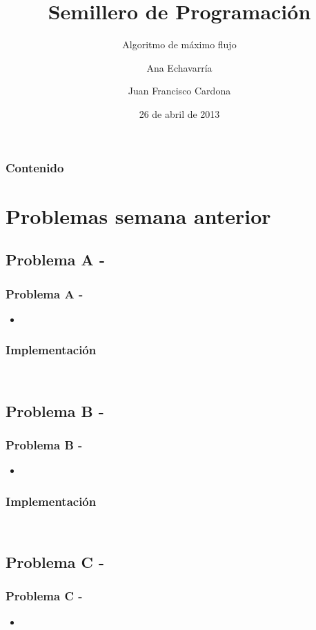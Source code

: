 \documentclass{beamer}
\title{Semillero de Programación}
\subtitle{Algoritmo de máximo flujo}
\author{Ana Echavarría \and Juan Francisco Cardona}
\institute{Universidad EAFIT}
\date{26 de abril de 2013}
\begin{document}
\begin{frame}
	\titlepage
\end{frame}

\begin{frame}
	\frametitle{Contenido}
	\tableofcontents
\end{frame}

\section{Problemas semana anterior}
	\subsection{Problema A - }
	
	\begin{frame}
		\frametitle{Problema A - }
		\begin{itemize}
			\item 
		\end{itemize}
	\end{frame}
	
	\begin{frame}[fragile]
		\frametitle{Implementación}
		\begin{lstlisting}
			
		\end{lstlisting}
	\end{frame}
	
	\subsection{Problema B - }
	\begin{frame}
		\frametitle{Problema B - }
		\begin{itemize}
			\item 
		\end{itemize}
	\end{frame}
	
	\begin{frame}
		\frametitle{Implementación}
		\begin{lstlisting}
			
		\end{lstlisting}
	\end{frame}
	
	\subsection{Problema C - }
	\begin{frame}
		\frametitle{Problema C - }
		\begin{itemize}
			\item 
		\end{itemize}
	\end{frame}
	
\end{document}
